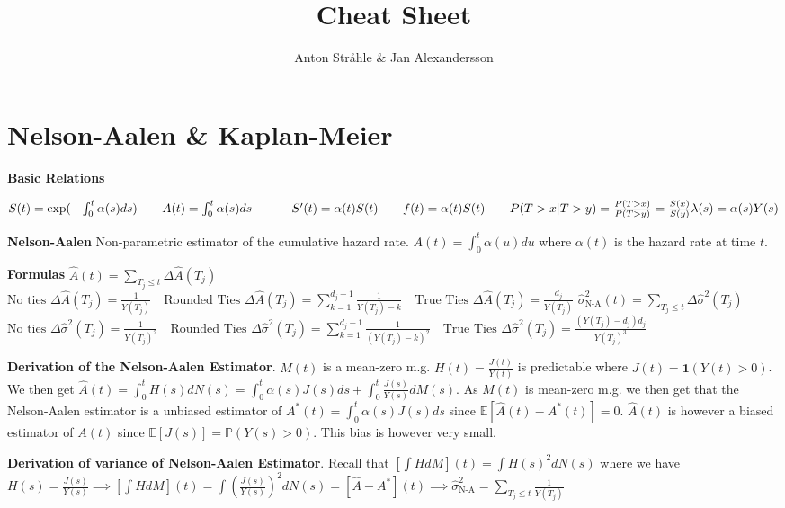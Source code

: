 \documentclass{article}
\title{Cheat Sheet}
\author{Anton Stråhle \& Jan Alexandersson}
\begin{document}
\section*{Nelson-Aalen \& Kaplan-Meier}

\textbf{Basic Relations}

$S(t) = \exp(-\int_0^t \alpha(s)ds) \qquad A(t) = \int_0^t \alpha(s)ds \qquad -S'(t) = \alpha(t)S(t) \qquad f(t)=\alpha(t) S(t) \qquad P(T>x | T>y) = \frac{P(T>x)}{P(T>y)} = \frac{S(x)}{S(y)} \\ \lambda(s) = \alpha(s)Y(s)$ 

\medskip

\textbf{Nelson-Aalen} Non-parametric estimator of the cumulative hazard rate. $A(t) = \int_0^t \alpha(u) du$ where $\alpha(t)$ is the hazard rate at time $t$. 

\medskip

\textbf{Formulas} $ \hat{A}(t) = \sum_{T_j \leq t} \Delta \hat{A}(T_j)$ \newline
$
\text{No ties } \Delta \hat{A}(T_j) = \frac{1}{Y(T_j)} \quad
\text{Rounded Ties } \Delta \hat{A}(T_j) = \sum_{k=1}^{d_j -1}\frac{1}{Y(T_j) - k} \quad
\text{True Ties } \Delta \hat{A}(T_j) = \frac{d_j}{Y(T_j)} $ \newline $
\hat\sigma^2_{\text{N-A}}(t) = \sum_{T_j \leq t} \Delta \hat\sigma^2(T_j) $\newline 
$
\text{No ties } \Delta \hat\sigma^2(T_j) = \frac{1}{Y(T_j)^2} \quad
\text{Rounded Ties } \Delta \hat\sigma^2(T_j) = \sum_{k=1}^{d_j -1}\frac{1}{(Y(T_j) - k)^2} \quad
\text{True Ties } \Delta \hat\sigma^2(T_j) = \frac{(Y(T_j)-d_j)d_j}{Y(T_j)^3}$

\medskip


\textbf{Derivation of the Nelson-Aalen Estimator}. $M(t)$ is a mean-zero m.g. $H(t) = \frac{J(t)}{Y(t)}$ is predictable where $J(t) = \mathbf{1}(Y(t) > 0)$. We then get $\hat{A}(t) = \int_0^t H(s)dN(s) = \int_0^t\alpha(s)J(s)ds + \int_0^t \frac{J(s)}{Y(s)}dM(s)$. As $M(t)$ is mean-zero m.g. we then get that the Nelson-Aalen estimator is a unbiased estimator of $A^*(t) = \int_0^t \alpha(s)J(s)ds $ since $\mathbb{E}\left[\hat{A}(t) - A^*(t)\right] = 0$. $\hat{A}(t)$ is however a biased estimator of $A(t)$ since $\mathbb{E}[J(s)] = \mathbb{P}(Y(s) > 0)$. This bias is however very small.

\medskip


\textbf{Derivation of variance of Nelson-Aalen Estimator}. Recall that $\left[\int HdM\right](t) = \int H(s)^2dN(s)$ where we have $H(s) = \frac{J(s)}{Y(s)} \implies \left[\int HdM\right](t) = \int \left(\frac{J(s)}{Y(s)}\right)^2dN(s) = [\hat{A} - A^*](t) \implies \hat\sigma^2_{\text{N-A}} = \sum_{T_j \leq t} \frac{1}{Y(T_j)}$ 
\end{document}
